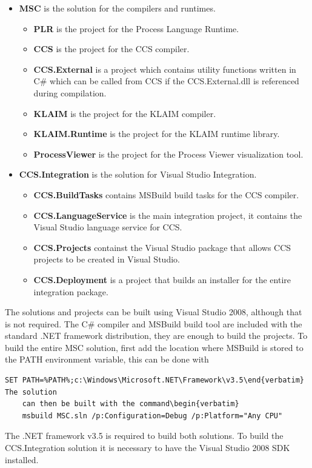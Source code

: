 	\begin{itemize}
		\item \textbf{MSC} is the solution for the compilers and runtimes.
		\begin{itemize}
			\item \textbf{PLR} is the project for the Process Language Runtime.
			\item \textbf{CCS} is the project for the CCS compiler.
			\item \textbf{CCS.External} is a project which contains utility 
			functions written in C\# which can be called from CCS if the 
			CCS.External.dll is referenced during compilation.
			\item \textbf{KLAIM} is the project for the KLAIM compiler.
			\item \textbf{KLAIM.Runtime} is the project for the KLAIM runtime 
			library.
			\item \textbf{ProcessViewer} is the project for the Process Viewer
			visualization tool.
		\end{itemize}
		\item \textbf{CCS.Integration} is the solution for Visual Studio 
		Integration.
		\begin{itemize}
			\item \textbf{CCS.BuildTasks} contains MSBuild build tasks for the CCS 
			compiler.
			\item \textbf{CCS.LanguageService} is the main integration project, it 
			contains the Visual Studio language service for CCS.
			\item \textbf{CCS.Projects} containst the Visual Studio package that 
			allows CCS projects to be created in Visual Studio.
			\item \textbf{CCS.Deployment} is a project that builds an installer for 
			the entire integration package.
		\end{itemize}
	\end{itemize}
	
	The solutions and projects can be built using Visual Studio 2008, although 
	that is not required. The C\# compiler and MSBuild build tool are included 
	with the standard .NET framework distribution, they are enough to build the 
	projects. To build the entire MSC solution, first add the location where
	MSBuild is stored to the PATH environment variable, this can be done with 
	\begin{verbatim}SET PATH=%PATH%;c:\Windows\Microsoft.NET\Framework\v3.5\end{verbatim} The solution 
	can then be built with the command\begin{verbatim} 
	msbuild MSC.sln /p:Configuration=Debug /p:Platform="Any CPU"
	\end{verbatim}
	The .NET framework v3.5 is required to build both solutions. To build the
	CCS.Integration solution it is necessary to have the Visual Studio 2008 SDK 
	installed.
	
